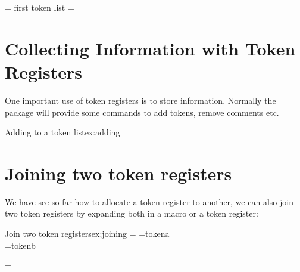 \begin{texexample}{}{}
\makeatletter
\newtoks\@exampletoksa
\newtoks\@exampletoksb
\@exampletoksa = {first token list}
\@exampletoksb=\@exampletoksa

\the\@exampletoksb
\makeatother
\end{texexample}




\section{Collecting Information with Token Registers}

One important use of token registers is to store information. Normally the package will provide some commands to add tokens, remove comments etc.

\begin{teXXX}
\def\addinfo #1{%
    \expandafter\expandafter\expandafter\collecttokens\expandafter{%
          \the\collecttokens #1}
}
\end{teXXX}


\begin{texexample}{Adding to a token list}{ex:adding}

\bgroup
\makeatletter
\def\addinfo#1{
  \expandafter\expandafter\expandafter
    \@exampletoksa\expandafter{%
     \the\@exampletoksa #1 }%
}
\addinfo{\hfill}
\addinfo{CHAPTER}
\addinfo{\kern0.5em}
\addinfo{50}
\the\@exampletoksa

\makeatother
\egroup

\end{texexample}


\section{Joining two token registers}

We have see so far how to allocate a token register to another, we can also join two token registers by expanding both in a macro or a token register:

\begin{texexample}{Join two token registers}{ex:joining}
\makeatletter
\bgroup
{}={}
\newtoks\@temptokenb
\@temptokena={tokena\\ }
\@temptokenb={tokenb}

\def\jointoks#1#2#3{%
  #1=\expandafter\expandafter\expandafter
    {\expandafter\the\expandafter#2\the#3}}

\jointoks{}{\@temptokena}{\@temptokenb}

\the{} 
\egroup
\makeatother
\end{texexample}




